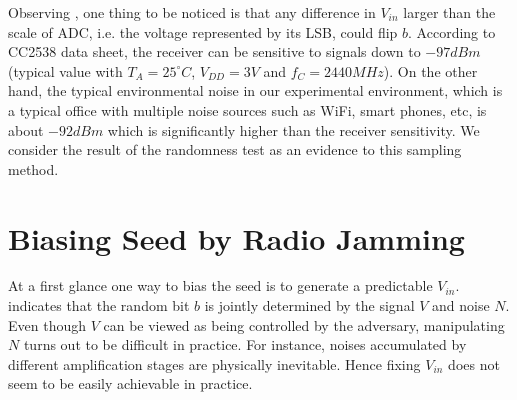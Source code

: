 Observing , one thing to be noticed is that any difference in $V_{in}$ larger than the scale of ADC, i.e. the voltage represented by its LSB, could flip $b$. According to CC2538 data sheet\cite{CC2538Datasheet}, the receiver can be sensitive to signals down to $-97dBm$ (typical value with $T_A = 25^{\circ}C$, $V_{DD} = 3V$ and $f_{C} = 2440MHz$). On the other hand, the typical environmental noise in our experimental environment, which is a typical office with multiple noise sources such as  WiFi, smart phones, etc, is about $-92dBm$ which is significantly higher than the receiver sensitivity. We consider the result of the randomness test as an evidence to this sampling method.

\section{Biasing Seed by Radio Jamming}
At a first glance one way to bias the seed is to generate a predictable $V_{in}$.  indicates that the random bit $b$ is jointly determined by the signal $V$ and noise $N$. Even though $V$ can be viewed as being controlled by the adversary, manipulating $N$ turns out to be difficult in practice. For instance, noises accumulated by different amplification stages are physically inevitable. Hence fixing $V_{in}$ does not seem to be easily achievable in practice.

